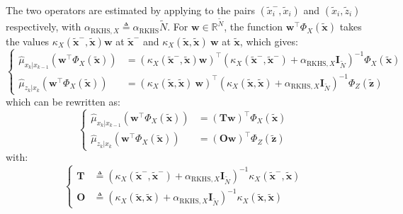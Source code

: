 The two operators are estimated by applying  to the pairs $\left(\tilde{x}_i^-,\tilde{x}_i\right)$ and $\left(\tilde{x}_i,\tilde{z}_i\right)$ respectively, with $\alpha_{\mathrm{RKHS},X}\triangleq\alpha_{\mathrm{RKHS}}\tilde{N}$. For $\mathbf{w}\in\mathbb{R}^{\tilde{N}}$, the function $\mathbf{w}^\top\Phi_X(\tilde{\mathbf{x}})$ takes the values $\kappa_X\left(\tilde{\mathbf{x}}^-,\tilde{\mathbf{x}}\right)\mathbf{w}$ at $\tilde{\mathbf{x}}^-$ and $\kappa_X(\tilde{\mathbf{x}},\tilde{\mathbf{x}})\:\mathbf{w}$ at $\tilde{\mathbf{x}}$, which gives:
\begin{equation}
	\left\{\begin{aligned}
	\hat{\mu}_{x_k|x_{k-1}}\left(\mathbf{w}^\top\Phi_X(\tilde{\mathbf{x}})\right)&=\left(\kappa_X\left(\tilde{\mathbf{x}}^-,\tilde{\mathbf{x}}\right)\mathbf{w}\right)^\top\left(\kappa_X\left(\tilde{\mathbf{x}}^-,\tilde{\mathbf{x}}^-\right)+\alpha_{\mathrm{RKHS},X}\mathbf{I}_{\tilde{N}}\right)^{-1}\Phi_X(\tilde{\mathbf{x}})\\
	\hat{\mu}_{z_k|x_k}\left(\mathbf{w}^\top\Phi_X(\tilde{\mathbf{x}})\right)&=\left(\kappa_X(\tilde{\mathbf{x}},\tilde{\mathbf{x}})\:\mathbf{w}\right)^\top\left(\kappa_X(\tilde{\mathbf{x}},\tilde{\mathbf{x}})+\alpha_{\mathrm{RKHS},X}\mathbf{I}_{\tilde{N}}\right)^{-1}\Phi_Z(\tilde{\mathbf{z}})
	\end{aligned}\right.
\end{equation}
which can be rewritten as:
\begin{equation}
	\left\{\begin{aligned}
	\hat{\mu}_{x_k|x_{k-1}}\left(\mathbf{w}^\top\Phi_X(\tilde{\mathbf{x}})\right)&=(\mathbf{T}\mathbf{w})^\top\Phi_X(\tilde{\mathbf{x}})\\
	\hat{\mu}_{z_k|x_k}\left(\mathbf{w}^\top\Phi_X(\tilde{\mathbf{x}})\right)&=(\mathbf{O}\mathbf{w})^\top\Phi_Z(\tilde{\mathbf{z}})
	\end{aligned}\right.
\end{equation}
with:
\begin{equation}
	\left\{\begin{aligned}
	\mathbf{T}&\triangleq\left(\kappa_X\left(\tilde{\mathbf{x}}^-,\tilde{\mathbf{x}}^-\right)+\alpha_{\mathrm{RKHS},X}\mathbf{I}_{\tilde{N}}\right)^{-1}\kappa_X\left(\tilde{\mathbf{x}}^-,\tilde{\mathbf{x}}\right)\\
	\mathbf{O}&\triangleq\left(\kappa_X(\tilde{\mathbf{x}},\tilde{\mathbf{x}})+\alpha_{\mathrm{RKHS},X}\mathbf{I}_{\tilde{N}}\right)^{-1}\kappa_X(\tilde{\mathbf{x}},\tilde{\mathbf{x}})
	\end{aligned}\right.
\end{equation}

